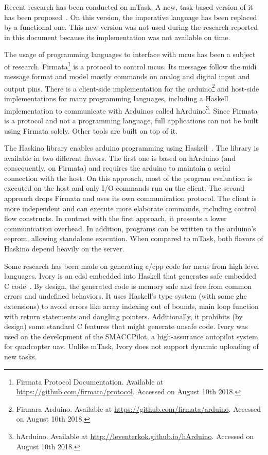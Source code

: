 Recent research has been conducted on \gls{mTask}. A new, task-based version of it has been proposed~\cite{micro}. On this version, the imperative language has been replaced by a functional one. This new version was not used during the research reported in this document because its implementation was not available on time.

The usage of programming languages to interface with \glspl{mcu} has been a subject of research. Firmata\footnote{Firmata Protocol Documentation. Available at \url{https://github.com/firmata/protocol}. Accessed on August 10th 2018.} is a protocol to control \glspl{mcu}. Its messages follow the \acs{midi} message format and model mostly commands on analog and digital input and output pins. There is a client-side implementation for the \gls{arduino}\footnote{Firmara Arduino. Available at \url{https://github.com/firmata/arduino}. Accessed on August 10th 2018.} and host-side implementations for many programming languages, including a Haskell implementation to communicate with Arduinos called hArduino\footnote{hArduino. Available at \url{http://leventerkok.github.io/hArduino}. Accessed on August 10th 2018.}. Since Firmata is a protocol and not a programming language, full applications can not be built using Firmata solely. Other tools are built on top of it.

The Haskino library enables \gls{arduino} programming using Haskell~\cite{haskino}. The library is available in two different flavors. The first one is based on hArduino (and consequently, on Firmata) and requires the \gls{arduino} to maintain a serial connection with the host. On this approach, most of the program evaluation is executed on the host and only I/O commands run on the client. The second approach drops Firmata and uses its own communication protocol. The client is more independent and can execute more elaborate commands, including control flow constructs. In contrast with the first approach, it presents a lower communication overhead. In addition, programs can be written to the \gls{arduino}'s \acs{eeprom}, allowing standalone execution. When compared to \gls{mTask}, both flavors of Haskino depend heavily on the server. 

Some research has been made on generating \gls{c}/\gls{cpp} code for \glspl{mcu} from high level languages. Ivory is an \ac{edsl} embedded into Haskell that generates safe embedded C code~\cite{ivory1,ivory2}. By design, the generated code is memory safe and free from common errors and undefined behaviors. It uses Haskell's type system (with some \acs{ghc} extensions) to avoid errors like array indexing out of bounds, main loop function with return statements and dangling pointers. Additionally, it prohibits (by design) some standard C features that might generate unsafe code. Ivory was used on the development of the SMACCPilot, a high-assurance autopilot system for quadcopter \ac{uav}. Unlike \gls{mTask}, Ivory does not support dynamic uploading of new tasks.

